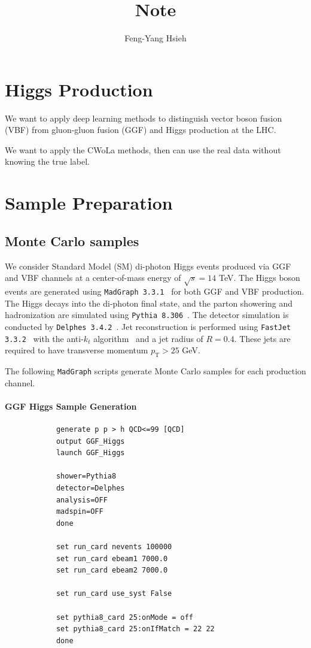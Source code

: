 \documentclass[12pt]{article}
\title{Note}
\author{Feng-Yang Hsieh}
\date{}
\begin{document}
\maketitle

\section{Higgs Production}%
\label{sec:higgs_production}
    We want to apply deep learning methods to distinguish vector boson fusion (VBF) from gluon-gluon fusion (GGF) and Higgs production at the LHC.

    We want to apply the CWoLa methods, then can use the real data without knowing the true label.
\section{Sample Preparation}%
\label{sec:sample_preparation}
    \subsection{Monte Carlo samples}%
    \label{sub:monte_carlo_samples}
        We consider Standard Model (SM) di-photon Higgs events produced via GGF and VBF channels at a center-of-mass energy of $\sqrt{s} = 14$ TeV. The Higgs boson events are generated using \verb|MadGraph 3.3.1|~\cite{Alwall:2014hca} for both GGF and VBF production. The Higgs decays into the di-photon final state, and the parton showering and hadronization are simulated using \verb|Pythia 8.306|~\cite{Sjostrand:2014zea}. The detector simulation is conducted by \verb|Delphes 3.4.2|~\cite{deFavereau:2013fsa}. Jet reconstruction is performed using \verb|FastJet 3.3.2|~\cite{Cacciari:2011ma} with the anti-$k_t$ algorithm~\cite{Cacciari:2008gp} and a jet radius of $R = 0.4$. These jets are required to have transverse momentum $p_{\text{T}} > 25$ GeV.

        The following \verb|MadGraph| scripts generate Monte Carlo samples for each production channel.
        \paragraph{GGF Higgs Sample Generation}
        \begin{lstlisting}
            generate p p > h QCD<=99 [QCD]
            output GGF_Higgs
            launch GGF_Higgs

            shower=Pythia8
            detector=Delphes
            analysis=OFF
            madspin=OFF
            done

            set run_card nevents 100000
            set run_card ebeam1 7000.0
            set run_card ebeam2 7000.0

            set run_card use_syst False

            set pythia8_card 25:onMode = off
            set pythia8_card 25:onIfMatch = 22 22
            done
        \end{lstlisting}
\end{document}
